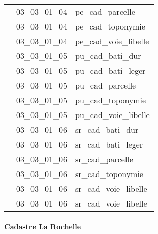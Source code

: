 \documentclass[12pt,titlepage,oneside]{book}
\begin{document}
\begin{supertabular}{|p{10cm}|c|p{15cm}|}
                    & 03\_03\_01\_04 & pe\_cad\_parcelle\\


                    & 03\_03\_01\_04 & pe\_cad\_toponymie\\


                    & 03\_03\_01\_04 & pe\_cad\_voie\_libelle\\


                    & 03\_03\_01\_05 & pu\_cad\_bati\_dur\\


                    & 03\_03\_01\_05 & pu\_cad\_bati\_leger\\


                    & 03\_03\_01\_05 & pu\_cad\_parcelle\\


                    & 03\_03\_01\_05 & pu\_cad\_toponymie\\


                    & 03\_03\_01\_05 & pu\_cad\_voie\_libelle\\


                    & 03\_03\_01\_06 & sr\_cad\_bati\_dur\\


                    & 03\_03\_01\_06 & sr\_cad\_bati\_leger\\


                    & 03\_03\_01\_06 & sr\_cad\_parcelle\\


                    & 03\_03\_01\_06 & sr\_cad\_toponymie\\


                    & 03\_03\_01\_06 & sr\_cad\_voie\_libelle\\


                    & 03\_03\_01\_06 & sr\_cad\_voie\_libelle\\
\hline
\end{supertabular}


\paragraph{Cadastre La Rochelle}
\noindent
\vspace{\baselineskip}
\end{document}
